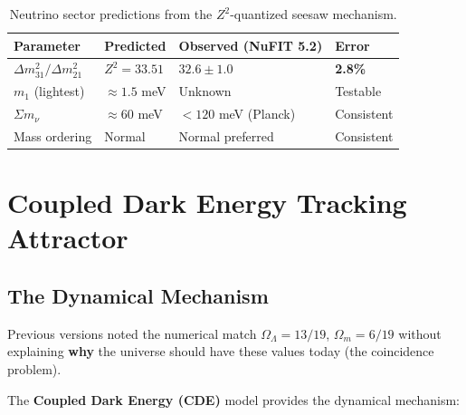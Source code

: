 \documentclass[11pt,a4paper]{article}
\theoremstyle{plain}
\theoremstyle{definition}
\theoremstyle{remark}
\begin{document}
\begin{center}
\end{center}

\begin{table}[h!]
\centering
\begin{tabular}{llll}
\toprule
\textbf{Parameter} & \textbf{Predicted} & \textbf{Observed (NuFIT 5.2)} & \textbf{Error} \\
\midrule
$\Delta m^2_{31}/\Delta m^2_{21}$ & $Z^2 = 33.51$ & $32.6 \pm 1.0$ & \textbf{2.8\%} \\
$m_1$ (lightest) & $\approx 1.5$ meV & Unknown & Testable \\
$\Sigma m_\nu$ & $\approx 60$ meV & $< 120$ meV (Planck) & Consistent \\
Mass ordering & Normal & Normal preferred & Consistent \\
\bottomrule
\end{tabular}
\caption{Neutrino sector predictions from the $Z^2$-quantized seesaw mechanism.}
\end{table}

\section{Coupled Dark Energy Tracking Attractor}
\label{sec:cde}

\subsection{The Dynamical Mechanism}

Previous versions noted the numerical match $\Omega_\Lambda = 13/19$, $\Omega_m = 6/19$ without explaining \textbf{why} the universe should have these values today (the coincidence problem).

The \textbf{Coupled Dark Energy (CDE)} model provides the dynamical mechanism:

\begin{center}
\end{center}
\end{document}
